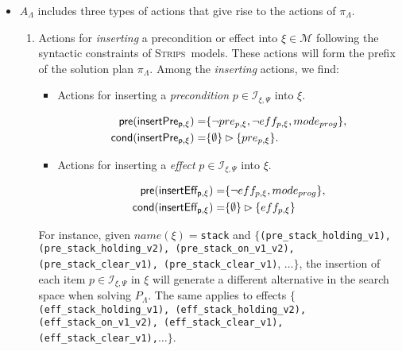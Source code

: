 \documentclass[runningheads]{llncs}
\newcommand{\pre}{\mathsf{pre}}     %
\newcommand{\cond}{\mathsf{cond}}   %
\newcommand{\strips}{\textsc{Strips}}     %
\begin{document}
\begin{itemize}
\item $A_{\Lambda}$ includes three types of actions that give rise to the actions of $\pi_\Lambda$.
\begin{enumerate}
\item Actions for {\em inserting} a precondition or effect into $\xi \in \mathcal{M}$ following the syntactic constraints of \strips\ models. These actions will form the prefix of the solution plan $\pi_\Lambda$. Among the \emph{inserting} actions, we find:
\begin{itemize}
\item Actions for inserting a {\em precondition} $p\in{\mathcal I}_{\xi,\Psi}$ into $\xi$.
\begin{small}
\begin{align*}
\hspace*{7pt}\pre(\mathsf{insertPre_{p,\xi}})=&\{\neg pre_{p,\xi}, \neg eff_{p,\xi}, mode_{prog}\},\\
\cond(\mathsf{insertPre_{p,\xi}})=&\{\emptyset\}\rhd\{pre_{p,\xi}\}.
\end{align*}
\end{small}

\item Actions for inserting a {\em effect} $p\in{\mathcal I}_{\xi,\Psi}$ into $\xi$.
\begin{small}
\begin{align*}
\hspace*{7pt}\pre(\mathsf{insertEff_{p,\xi}})=&\{\neg eff_{p,\xi}, mode_{prog}\},\\
\cond(\mathsf{insertEff_{p,\xi}})=&\{\emptyset\}\rhd\{eff_{p,\xi}\}
\end{align*}
\end{small}
\end{itemize}

For instance, given $name(\xi)=${\tt{\small stack}} and $\{${\tt{\small (pre\_stack\_holding\_v1),} {\tt\small (pre\_stack\_holding\_v2)}, {\tt\small(pre\_stack\_on\_v1\_v2)}, {\tt\small(pre\_stack\_clear\_v1)}, {\tt\small(pre\_stack\_clear\_v1)}}, $\ldots \}$, the insertion of each item $p \in {\mathcal I}_{\xi,\Psi}$ in $\xi$ will generate a different alternative in the search space when solving $P_{\Lambda}$. The same applies to effects $\{${\tt{\small (eff\_stack\_holding\_v1)}, {\tt\small(eff\_stack\_holding\_v2)}, {\tt\small (eff\_stack\_on\_v1\_v2)}, {\tt\small (eff\_stack\_clear\_v1)}, {\tt\small (eff\_stack\_clear\_v1),}}$\ldots \}$.

\vspace{0.1cm}


\end{enumerate}
\end{itemize}
\end{document}
